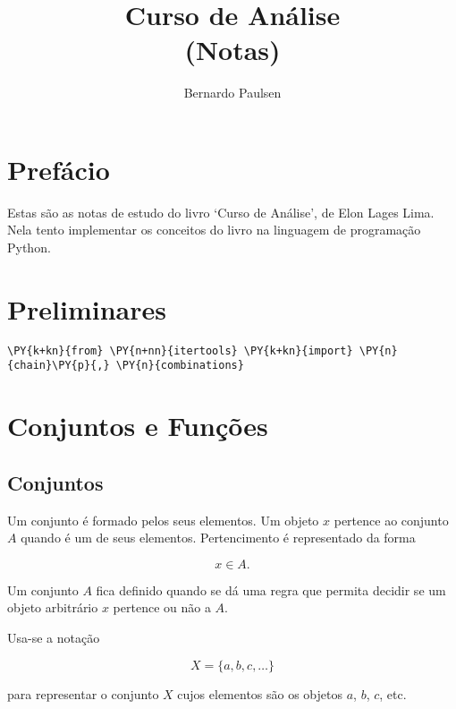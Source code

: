 \documentclass{book}
\title{Curso de Análise \\
(Notas)}
\author{Bernardo Paulsen}
\begin{document}
\maketitle

\chapter*{Prefácio}

    Estas são as notas de estudo do livro `Curso de Análise', de Elon Lages Lima. Nela tento implementar os conceitos do livro na linguagem de programação Python.

\tableofcontents


\chapter*{Preliminares}



\begin{Verbatim}[commandchars=\\\{\},frame=single,fontsize=\small, xleftmargin=0.5em]
\PY{k+kn}{from} \PY{n+nn}{itertools} \PY{k+kn}{import} \PY{n}{chain}\PY{p}{,} \PY{n}{combinations}
\end{Verbatim}


\chapter{Conjuntos e Funções}

    \section{Conjuntos}

        Um conjunto é formado pelos seus elementos. Um objeto $x$ pertence ao conjunto $A$ quando é um de seus elementos. Pertencimento é representado da forma

        $$ x \in A \text{.}$$

        Um conjunto $A$ fica definido quando se dá uma regra que permita decidir se um objeto arbitrário $x$ pertence ou não a $A$.

        Usa-se a notação

        $$ X = \{a,b,c,\ldots\} $$

        para representar o conjunto $X$ cujos elementos são os objetos $a$, $b$, $c$, etc.
\end{document}
